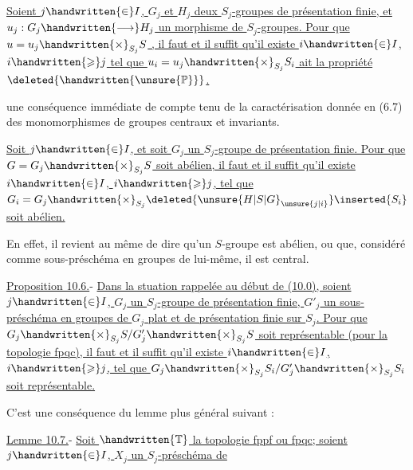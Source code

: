 



 \uline{Soient $j\handwritten{\in}I$, $G_j$ et $H_j$ deux $S_j$-groupes de présentation finie, et $u_j:G_j\handwritten{\longrightarrow}H_j$ un morphisme de $S_j$-groupes. Pour que $u=u_j\handwritten{\times}_{S_j}S$  }\uline{, il faut et il suffit qu'il existe $i\handwritten{\in}I$, $i\handwritten{\geqslant}j$ tel que $u_i=u_j\handwritten{\times}_{S_j}S_i$ ait la propriété $\deleted{\handwritten{\unsure{\mathbb{P}}}}$.}

 une conséquence immédiate de  compte tenu de la caractérisation donnée en (6.7) des monomorphismes de groupes centraux et invariants.

  \uline{Soit $j\handwritten{\in}I$, et soit $G_j$ un $S_j$-groupe de présentation finie. Pour que $G=G_j\handwritten{\times}_{S_j}S$ soit abélien, il faut et il suffit qu'il existe $i\handwritten{\in}I$, $i\handwritten{\geqslant}j$, tel que $G_i=G_j\handwritten{\times}_{S_j}\deleted{\unsure{H|S|G}_{\unsure{j|i}}}\inserted{S_i}$ soit abélien.}

En effet, il revient au même de dire qu'un $S$-groupe est abélien, ou que, considéré comme sous-préschéma en groupes de lui-même, il est central.

\uline{Proposition 10.6.}- \uline{Dans la stuation rappelée au début de (10.0), soient $j\handwritten{\in}I$, $G_j$ un $S_j$-groupe de présentation finie, $G'_j$ un sous-préschéma en groupes de $G_j$ plat et de présentation finie sur $S_j$. Pour que $G_j\handwritten{\times}_{S_j}S/G'_j\handwritten{\times}_{S_j}S$ soit représentable (pour la topologie fpqc), il faut et il suffit qu'il existe $i\handwritten{\in}I$, $i\handwritten{\geqslant}j$, tel que $G_j\handwritten{\times}_{S_j}S_i/G'_j\handwritten{\times}_{S_j}S_i$ soit représentable.}

C'est une conséquence du lemme plus général suivant :

\uline{Lemme 10.7.}- \uline{Soit $\handwritten{\mathbb{T}}$ la topologie fppf ou fpqc; soient $j\handwritten{\in}I$, $X_j$ un $S_j$-préschéma de}
